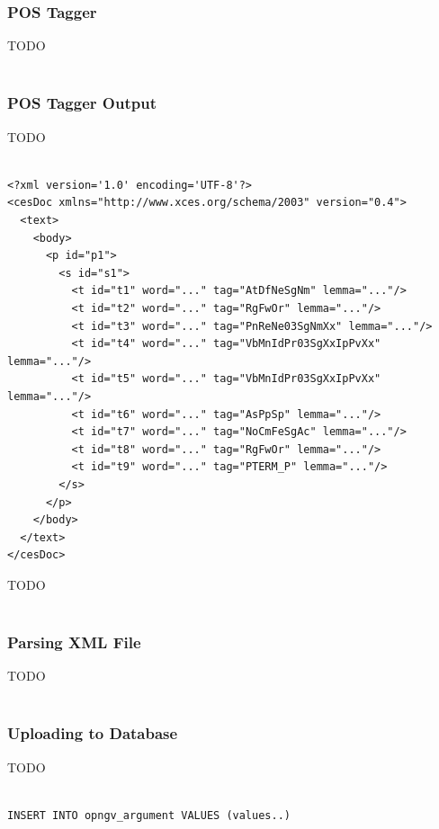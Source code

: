\subsubsection{POS Tagger}\label{3221_ref}
TODO\\
\\
\subsubsection{POS Tagger Output}\label{3222_ref}
TODO\\
\\



\begin{lstlisting}[frame=single, basicstyle=\small]
<?xml version='1.0' encoding='UTF-8'?>
<cesDoc xmlns="http://www.xces.org/schema/2003" version="0.4">
  <text>
    <body>
      <p id="p1">
        <s id="s1">
          <t id="t1" word="..." tag="AtDfNeSgNm" lemma="..."/>
          <t id="t2" word="..." tag="RgFwOr" lemma="..."/>
          <t id="t3" word="..." tag="PnReNe03SgNmXx" lemma="..."/>
          <t id="t4" word="..." tag="VbMnIdPr03SgXxIpPvXx" lemma="..."/>
          <t id="t5" word="..." tag="VbMnIdPr03SgXxIpPvXx" lemma="..."/>
          <t id="t6" word="..." tag="AsPpSp" lemma="..."/>
          <t id="t7" word="..." tag="NoCmFeSgAc" lemma="..."/>
          <t id="t8" word="..." tag="RgFwOr" lemma="..."/>
          <t id="t9" word="..." tag="PTERM_P" lemma="..."/>
        </s>
      </p>
    </body>
  </text>
</cesDoc>
\end{lstlisting}

TODO\\
\\

\subsubsection{Parsing XML File}\label{3223_ref}
TODO\\
\\
\subsubsection{Uploading to Database}\label{3224_ref}
TODO\\
\\
\lstset{language=SQL}
\begin{lstlisting}[frame=single, basicstyle=\small]
INSERT INTO opngv_argument VALUES (values..)
\end{lstlisting}

